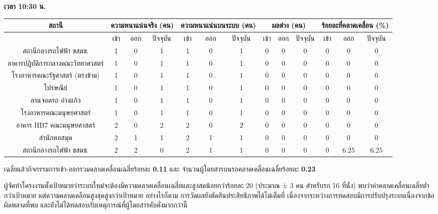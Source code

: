     \textbf{เวลา 10:30 น.}
    {\tiny\begin{center}
        \begin{tabular}{ | c | c | c | c | c | c | c | c | c | c | c | c | c |  }
            \hline
                \multirow{2}{*}{สถานี} & \multicolumn{3}{|c|}{ความหนาแน่นจริง (คน)} & \multicolumn{3}{|c|}{ความหนาแน่นบนระบบ (คน)} & \multicolumn{3}{|c|}{ผลต่าง (คน)} & \multicolumn{3}{|c|}{ร้อยละที่คลาดเคลื่อน (\%)} \\
            \hline
                & เข้า & ออก & ปัจจุบัน & เข้า & ออก & ปัจจุบัน & เข้า & ออก & ปัจจุบัน & เข้า & ออก & ปัจจุบัน \\
            \hline
                สถานีกลางรถไฟฟ้า ขสมช.            & 1 & 0 & 1 & 1 & 0 & 1 & 0 & 0 & 0 & 0 & 0 & 0 \\
                อาคารปฏิบัติการกลางคณะวิทยาศาสตร์    & 1 & 0 & 1 & 1 & 0 & 1 & 0 & 0 & 0 & 0 & 0 & 0 \\
                โรงอาหารคณะรัฐศาสตร์ (ตรงข้าม)      & 1 & 0 & 1 & 1 & 0 & 1 & 0 & 0 & 0 & 0 & 0 & 0 \\
                ไปรษณีย์                          & 1 & 0 & 1 & 1 & 0 & 1 & 0 & 0 & 0 & 0 & 0 & 0 \\
                ลานจอดรถ อ่างแก้ว                  & 1 & 0 & 1 & 1 & 0 & 1 & 0 & 0 & 0 & 0 & 0 & 0 \\
                โรงอาหารคณะมนุษยศาสตร์            & 1 & 0 & 1 & 1 & 0 & 1 & 0 & 0 & 0 & 0 & 0 & 0 \\
                อาคาร HB7 คณะมนุษยศาสตร์          & 2 & 0 & 2 & 2 & 0 & 2 & 0 & 0 & 0 & 0 & 0 & 0 \\
                สำนักหอสมุด                       & 2 & 1 & 1 & 2 & 1 & 1 & 0 & 0 & 0 & 0 & 0 & 0 \\
                สถานีกลางรถไฟฟ้า ขสมช.            & 2 & 2 & 0 & 2 & 1 & 1 & 0 & 0 & 0 & 0 & 6.25 & 6.25 \\
            \hline
        \end{tabular}
    \end{center}}

    เฉลี่ยแล้วกิจกรรมการเข้า-ออกรวมคลาดเคลื่อนเฉลี่ยร้อยละ \textbf{0.11} และ จำนวนผู้โดยสารบนรถคลาดเคลื่อนเฉลี่ยร้อยละ \textbf{0.23}

ผู้จัดทำโครงงานตั้งเป้าหมายว่าระบบใหม่จะต้องมีความคลาดเคลื่อนเฉลี่ยและสูงสดน้อยกว่าร้อยละ 20 (ประมาณ ± 3 คน สําหรับรถ 16 ที่นั่ง) พบว่าค่าคลาดเคลื่อนเฉลี่ยต่ำกว่าเป้าหมาย แต่ความคลาดเคลือนสูงสุดสูงกว่าเป้าหมาย อย่างไรก็ตาม การวัดผลยังตัดสินประสิทธิภาพได้ไม่เต็มที่ เนื่องจากระหว่างการทดสอบมีการปรับปรุงระบบเนื่องจากข้อผิดพลาดที่พบ และยังไม่ได้ทดสอบกับเหตุการณ์ที่ผู้โดยสารคับคั่งมากกว่านี้

